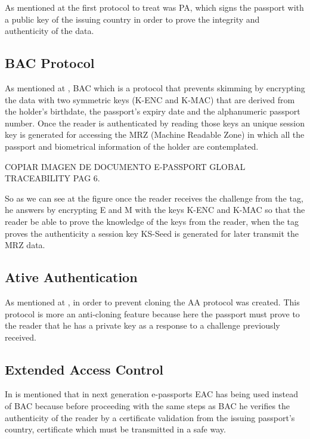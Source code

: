 \documentclass{acm_proc_article-sp}
\begin{document}
As mentioned at \cite{NM12} the first protocol to treat was PA, which signs the passport with a public key of the issuing country in order to prove the integrity and authenticity of the data.

\subsection{BAC Protocol}
As mentioned at \cite{CLPS07}, BAC which is a protocol that prevents skimming by encrypting the data with two symmetric keys (K-ENC and K-MAC) that are derived from the holder’s birthdate, the passport’s expiry date and the alphanumeric passport number. Once the reader is authenticated by reading those keys an unique session key is generated for accessing the MRZ (Machine Readable Zone) in which all the passport and biometrical information of the holder are contemplated. 

COPIAR IMAGEN DE DOCUMENTO E-PASSPORT GLOBAL TRACEABILITY PAG 6. 

So as we can see at the figure once the reader receives the challenge from the tag, he answers by encrypting E and M with the keys K-ENC and K-MAC so that the reader be able to prove the knowledge of the keys from the reader, when the tag proves the authenticity a session key KS-Seed is generated for later transmit the MRZ data.

\subsection{Ative Authentication}
As mentioned at \cite{JUAR2005}, in order to prevent cloning the AA protocol was created. This protocol is more an anti-cloning feature because here the passport must prove to the reader that he has a private key as a response to a challenge previously received.

\subsection{Extended Access Control}
In \cite{NM12} is mentioned that in next generation e-passports EAC has being used instead of BAC because before proceeding with the same steps as BAC he verifies the authenticity of the reader by a certificate validation from the issuing passport’s country, certificate which must be transmitted in a safe way.

\end{document}
